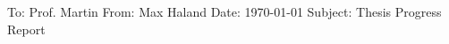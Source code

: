 \documentclass[12pt, titlepage]{article}
\begin{document}
\singlespacing
\setlength{\parindent}{0cm}

To: Prof. Martin \newline
From: Max Haland \newline
Date: \today
\newline \newline
Subject: Thesis Progress Report

\setlength{\parskip}{1em}
\setlength{\parindent}{1cm}

\end{document}

